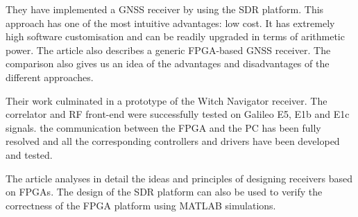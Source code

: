 They have implemented a GNSS receiver by using the SDR platform. This approach has one of the most intuitive advantages: low cost. It has extremely high software customisation and can be readily upgraded in terms of arithmetic power. The article also describes a generic FPGA-based GNSS receiver. The comparison also gives us an idea of the advantages and disadvantages of the different approaches.

Their work culminated in a prototype of the Witch Navigator receiver. The correlator and RF front-end were successfully tested on Galileo E5, E1b and E1c signals. the communication between the FPGA and the PC has been fully resolved and all the corresponding controllers and drivers have been developed and tested.

The article analyses in detail the ideas and principles of designing receivers based on FPGAs. The design of the SDR platform can also be used to verify the correctness of the FPGA platform using MATLAB simulations.
